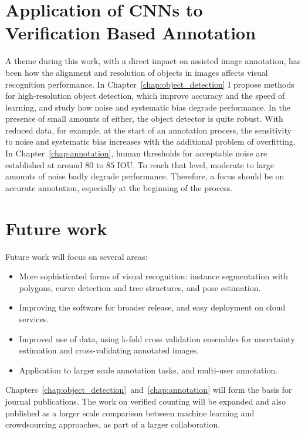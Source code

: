 \section{Application of \texorpdfstring{\gls{CNN}s}{} to Verification Based Annotation}

A theme during this work, with a direct impact on assisted image annotation, has been how the alignment and resolution of objects in images affects visual recognition performance. In Chapter~\ref{chap:object_detection} I propose methods for high-resolution object detection, which improve accuracy and the speed of learning, and study how noise and systematic bias degrade performance. In the presence of small amounts of either, the object detector is quite robust. With reduced data, for example, at the start of an annotation process, the sensitivity to noise and systematic bias increases with the additional problem of overfitting. In Chapter~\ref{chap:annotation}, human thresholds for acceptable noise are established at around $80$ to $85$ \gls{IOU}. To reach that level, moderate to large amounts of noise badly degrade performance. Therefore, a focus should be on accurate annotation, especially at the beginning of the process.

\section {Future work}

Future work will focus on several areas: 

\begin{itemize}
    \item More sophisticated forms of visual recognition: instance segmentation with polygons, curve detection and tree structures, and pose estimation.
    \item Improving the software for broader release, and easy deployment on cloud services.
    \item Improved use of data, using k-fold cross validation ensembles for uncertainty estimation and cross-validating annotated images.
    \item Application to larger scale annotation tasks, and multi-user annotation.
\end{itemize}


 Chapters~\ref{chap:object_detection}~and~\ref{chap:annotation} will form the basis for journal publications. The work on verified counting will be expanded and also published as a larger scale comparison between machine learning and crowdsourcing approaches, as part of a larger collaboration.






